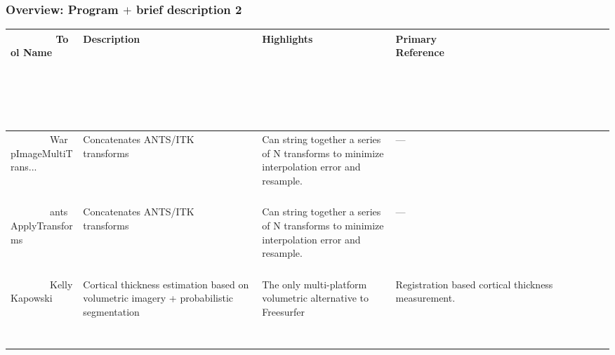 \documentclass[18pt]{beamer}
\begin{document}
\begin{frame}
\frametitle{Overview:  Program $+$ brief description 2}
\begin{tiny}
{
\begin{table}
\begin{tabular}{|p{2.1cm}|p{2.4cm}|p{3cm}|p{3cm}|}
\hline
        Tool Name                                     & Description                                                                                                                                                    & Highlights                                                                                                         & Primary Reference                                                                                                                                                                                   \\ \hline
        WarpImageMultiTrans... & Concatenates ANTS/ITK transforms                                                                                                                               & Can string together a series of N transforms to minimize interpolation error and resample.                         & ---                                                                                                                                                                                             \\ 
        antsApplyTransforms & Concatenates ANTS/ITK transforms                                                                                                                               & Can string together a series of N transforms to minimize interpolation error and resample.                         & ---                                                                                                                                                                                             \\ 
        KellyKapowski                                 & Cortical thickness estimation based on volumetric imagery + probabilistic segmentation                                                                         & The only multi-platform volumetric alternative to Freesurfer                                                       & Registration based cortical thickness measurement.                                                                                                                                                  \\ 

\end{tabular}
\end{table}}
\end{tiny}
\end{frame}
\end{document}

